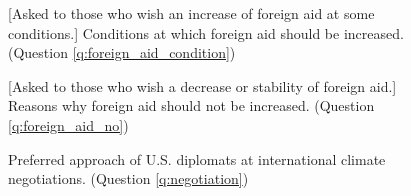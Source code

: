 \begin{figure}[h!]
    \caption{[Asked to those who wish an increase of foreign aid at some conditions.] Conditions at which foreign aid should be increased. (Question \ref{q:foreign_aid_condition})}\label{fig:foreign_aid_condition}
\end{figure}

\begin{figure}[h!]
    \caption{[Asked to those who wish a decrease or stability of foreign aid.] Reasons why foreign aid should not be increased. (Question \ref{q:foreign_aid_no})}\label{fig:foreign_aid_no}
\end{figure}

\begin{figure}[h!]
    \caption{Preferred approach of U.S. diplomats at international climate negotiations. (Question \ref{q:negotiation})}\label{fig:negotiation}
\end{figure}

